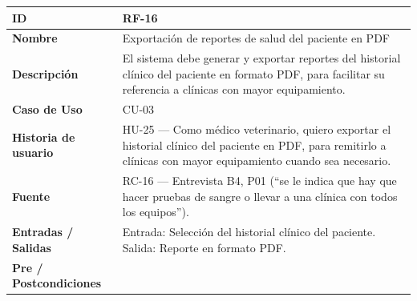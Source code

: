 \documentclass[
]{article}
\newcounter{none} %
\begin{document}
{\def\LTcaptype{none} %
\begin{longtable}[]{|
  >{\raggedright\arraybackslash}p{}|
  >{\raggedright\arraybackslash}p{}|}
\hline
\begin{minipage}[b]{\linewidth}\raggedright
\textbf{ID}
\end{minipage} & \begin{minipage}[b]{\linewidth}\raggedright
RF-16
\end{minipage} \\
\hline
\endhead
\hline
\endlastfoot
\textbf{Nombre} & \begin{minipage}[t]{\linewidth}\raggedright
Exportación de reportes de salud del paciente en PDF
\end{minipage} \\
\hline
\textbf{Descripción} & \begin{minipage}[t]{\linewidth}\raggedright
El sistema debe generar y exportar reportes del historial clínico del paciente en formato PDF, para facilitar su referencia a clínicas con mayor equipamiento.
\end{minipage} \\
\hline
\textbf{Caso de Uso} & \begin{minipage}[t]{\linewidth}\raggedright
CU-03
\end{minipage} \\
\hline
\textbf{Historia de usuario} & \begin{minipage}[t]{\linewidth}\raggedright
HU-25 — Como médico veterinario, quiero exportar el historial clínico del paciente en PDF, para remitirlo a clínicas con mayor equipamiento cuando sea necesario.
\end{minipage} \\
\hline
\textbf{Fuente} & \begin{minipage}[t]{\linewidth}\raggedright
RC-16 — Entrevista B4, P01 (“se le indica que hay que hacer pruebas de sangre o llevar a una clínica con todos los equipos”).
\end{minipage} \\
\hline
\textbf{Entradas / Salidas} & \begin{minipage}[t]{\linewidth}\raggedright
Entrada: Selección del historial clínico del paciente. Salida: Reporte en formato PDF.
\end{minipage} \\
\hline
\textbf{Pre / Postcondiciones} & \begin{minipage}[t]{\linewidth}\raggedright

\end{minipage}
\end{longtable}}
\end{document}

